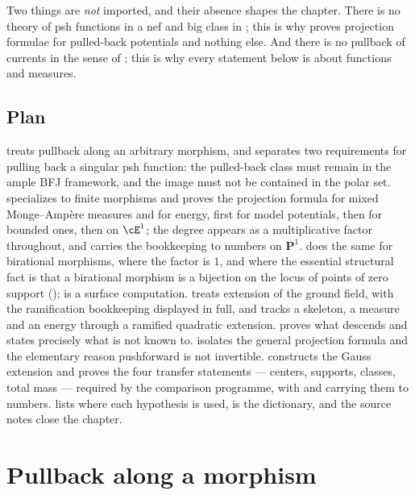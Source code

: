 Two things are \emph{not} imported, and their absence shapes the chapter.
There is no theory of psh functions in a nef and big class in
; this is why  proves projection
formulae for pulled-back potentials and nothing else.  And there is no
pullback of currents in the sense of ; this is why every
statement below is about functions and measures.

\subsection{Plan}
\label{sec:ch30-plan}

 treats pullback along an arbitrary morphism, and
separates two requirements for pulling back a singular psh function: the
pulled-back class must remain in the ample BFJ framework, and the image must
not be contained in the polar set.
 specializes to finite morphisms and proves the
projection formula for mixed Monge--Amp\`ere measures and for energy, first
for model potentials, then for bounded ones, then on \(\cE^1\); the degree
appears as a multiplicative factor throughout, and
 carries the bookkeeping to numbers on
\(\mathbf P^1\).   does the same for birational
morphisms, where the factor is \(1\), and where the essential structural fact
is that a birational morphism is a bijection on the locus of points of zero
support (); 
is a surface computation.   treats extension of
the ground field, with the ramification bookkeeping displayed in full, and
 tracks a skeleton, a measure and an energy
through a ramified quadratic extension.   proves what
descends and states precisely what is not known to.
 isolates the general projection formula and the
elementary reason pushforward is not invertible.  
constructs the Gauss extension and proves the four transfer statements ---
centers, supports, classes, total mass --- required by the comparison
programme, with  and
 carrying them to numbers.
 lists where each hypothesis is used,
 is the dictionary, and the source notes close the
chapter.

\section{Pullback along a morphism}
\label{sec:ch30-pullback}

